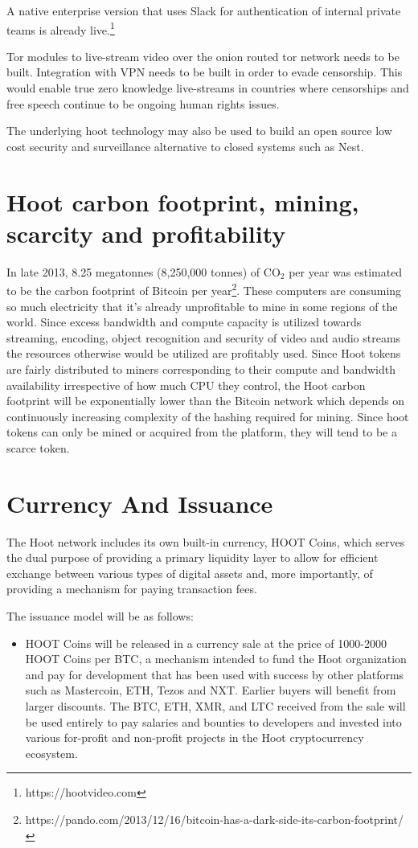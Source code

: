 \documentclass{article}
\begin{document}
A native enterprise version that uses Slack for authentication of
internal private teams is already live.\footnote{https://hootvideo.com}

Tor modules to live-stream video over the onion routed tor network needs
to be built. Integration with VPN needs to be built in order to evade censorship. This would enable true zero knowledge live-streams in
countries where censorships and free speech continue to be ongoing
human rights issues.

The underlying hoot technology may also be used to build an open
source low cost security and surveillance alternative to closed systems
such as Nest.

\section{Hoot carbon footprint, mining, scarcity and profitability}
In late 2013, 8.25 megatonnes (8,250,000 tonnes) of CO$_2$ per year
was estimated to be the carbon footprint of Bitcoin per year\footnote{https://pando.com/2013/12/16/bitcoin-has-a-dark-side-its-carbon-footprint/}. These
computers are consuming so much electricity that it’s already
unprofitable to mine in some regions of the world. Since excess
bandwidth and compute capacity is utilized towards streaming,
encoding, object recognition
and security of video and audio streams the resources otherwise would
be utilized are profitably used.  Since Hoot tokens are fairly distributed to miners corresponding to their compute and bandwidth availability irrespective of how much CPU they control, the Hoot carbon footprint will be exponentially lower than the Bitcoin network which depends on continuously increasing complexity of the hashing required for mining. Since hoot tokens can only be mined or acquired from the platform, they will tend to be a scarce token. 

\section{Currency And Issuance}

The Hoot network includes its own built-in currency, HOOT Coins, which serves the dual purpose of providing a primary liquidity layer to allow for efficient exchange between various types of digital assets and, more importantly, of providing a mechanism for paying transaction fees.

The issuance model will be as follows:

\begin{itemize}

\item HOOT Coins will be released in a currency sale at the price of 1000-2000 HOOT Coins per BTC, a mechanism intended to fund the Hoot organization and pay for development that has been used with success by other platforms such as Mastercoin, ETH, Tezos and NXT. Earlier buyers will benefit from larger discounts. The BTC, ETH, XMR, and LTC received from the sale will be used entirely to pay salaries and bounties to developers and invested into various for-profit and non-profit projects in the Hoot cryptocurrency ecosystem.

\end{itemize}
\end{document}
